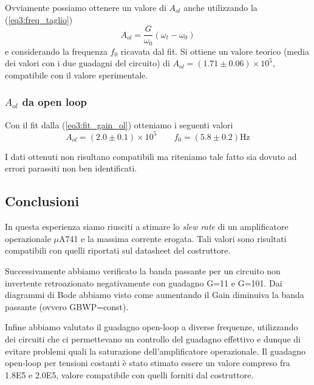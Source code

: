 Ovviamente possiamo ottenere un valore di $A_{ol}$ anche utilizzando la (\ref{eq3:freq_taglio})
$$A_{ol} = \frac{G}{\omega_0} (\omega_t - \omega_0)$$
e considerando la frequenza $f_0$ ricavata dal fit. Si ottiene un valore teorico (media dei valori con i due guadagni del circuito) di $A_{ol} = (1.71\pm 0.06)\times 10^5$, compatibile con il valore sperimentale.

\subsubsection{$A_{ol}$ da open loop}

Con il fit dalla (\ref{eq3:fit_gain_ol}) otteniamo i seguenti valori
$$A_{ol}=(2.0\pm0.1)\times 10^5 \qquad f_0=(5.8\pm0.2)\si{\hertz}$$

I dati ottenuti non risultano compatibili ma riteniamo tale fatto sia dovuto ad errori parassiti non ben identificati.

\subsection*{Conclusioni}

In questa esperienza siamo riusciti a stimare lo \textit{slew rate} di un amplificatore operazionale $\mu$A741 e la massima corrente erogata. Tali valori sono risultati compatibili con quelli riportati sul datasheet del costruttore. 

Successivamente abbiamo verificato la banda passante per un circuito non invertente retroazionato negativamente con guadagno G=11 e G=101. Dai diagrammi di Bode abbiamo visto come aumentando il Gain diminuiva la banda passante (ovvero GBWP=const).

Infine abbiamo valutato il guadagno open-loop a diverse frequenze, utilizzando dei circuiti che ci permettevano un controllo del guadagno effettivo e dunque di evitare problemi quali la saturazione dell'amplificatore operazionale. Il guadagno open-loop per tensioni costanti è stato stimato essere un valore compreso fra \num{1.8E5} e \num{2.0E5}, valore compatibile con quelli forniti dal costruttore.